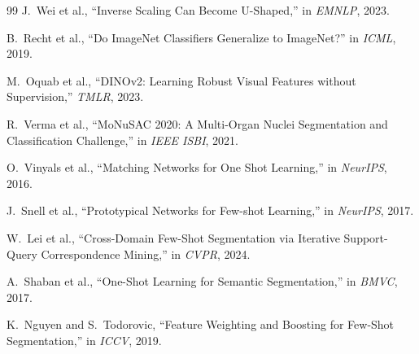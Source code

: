 \documentclass[10pt,twocolumn,letterpaper]{article}
\begin{document}
{\begin{thebibliography}{99}
J.~Wei et al., ``Inverse Scaling Can Become U-Shaped,'' in \emph{EMNLP},
2023.

B.~Recht et al., ``Do ImageNet Classifiers Generalize to ImageNet?'' in
\emph{ICML}, 2019.

M.~Oquab et al., ``DINOv2: Learning Robust Visual Features without
Supervision,'' \emph{TMLR}, 2023.

R.~Verma et al., ``MoNuSAC 2020: A Multi-Organ Nuclei Segmentation and
Classification Challenge,'' in \emph{IEEE ISBI}, 2021.

O.~Vinyals et al., ``Matching Networks for One Shot Learning,'' in
\emph{NeurIPS}, 2016.

J.~Snell et al., ``Prototypical Networks for Few-shot Learning,'' in
\emph{NeurIPS}, 2017.

W.~Lei et al., ``Cross-Domain Few-Shot Segmentation via Iterative
Support-Query Correspondence Mining,'' in \emph{CVPR}, 2024.

A.~Shaban et al., ``One-Shot Learning for Semantic Segmentation,'' in
\emph{BMVC}, 2017.

K.~Nguyen and S.~Todorovic, ``Feature Weighting and Boosting for Few-Shot
Segmentation,'' in \emph{ICCV}, 2019.

\end{thebibliography}
}
\end{document}
